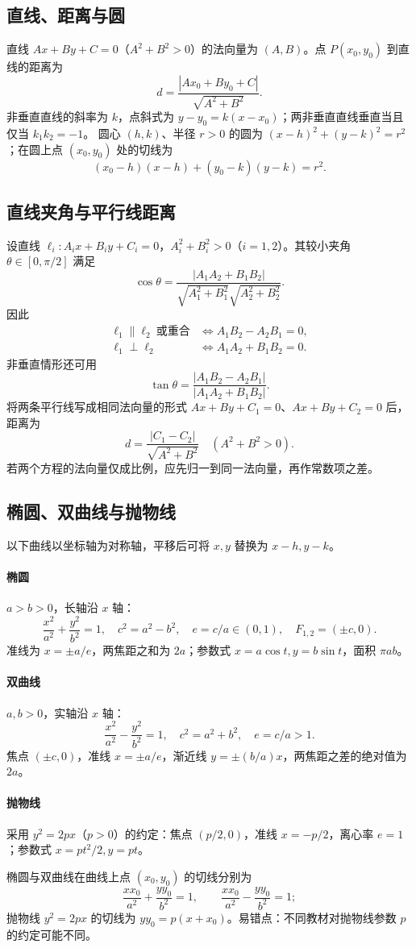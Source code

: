 \documentclass[../main.tex]{subfiles}
\begin{document}
\subsection{直线、距离与圆}
直线 $Ax+By+C=0$（$A^2+B^2>0$）的法向量为 $(A,B)$。点 $P(x_0,y_0)$ 到直线的距离为
\[
d=\frac{|Ax_0+By_0+C|}{\sqrt{A^2+B^2}}.
\]
非垂直直线的斜率为 $k$，点斜式为 $y-y_0=k(x-x_0)$；两非垂直直线垂直当且仅当 $k_1k_2=-1$。
圆心 $(h,k)$、半径 $r>0$ 的圆为 $(x-h)^2+(y-k)^2=r^2$；在圆上点 $(x_0,y_0)$ 处的切线为
\[
(x_0-h)(x-h)+(y_0-k)(y-k)=r^2.
\]
\subsection{直线夹角与平行线距离}
设直线 $\ell_i:A_ix+B_iy+C_i=0$，$A_i^2+B_i^2>0$（$i=1,2$）。其较小夹角 $\theta\in[0,\pi/2]$ 满足
\[
\cos\theta=
\frac{|A_1A_2+B_1B_2|}
{\sqrt{A_1^2+B_1^2}\sqrt{A_2^2+B_2^2}}.
\]
因此
\begin{align*}
\ell_1\parallel\ell_2\ \text{或重合}
&\iff A_1B_2-A_2B_1=0,\\
\ell_1\perp\ell_2&\iff A_1A_2+B_1B_2=0.
\end{align*}
非垂直情形还可用
\[
\tan\theta=\frac{|A_1B_2-A_2B_1|}{|A_1A_2+B_1B_2|}.
\]
将两条平行线写成相同法向量的形式 $Ax+By+C_1=0$、$Ax+By+C_2=0$ 后，距离为
\[
d=\frac{|C_1-C_2|}{\sqrt{A^2+B^2}}\quad(A^2+B^2>0).
\]
若两个方程的法向量仅成比例，应先归一到同一法向量，再作常数项之差。
\subsection{椭圆、双曲线与抛物线}
以下曲线以坐标轴为对称轴，平移后可将 $x,y$ 替换为 $x-h,y-k$。
\paragraph{椭圆} $a>b>0$，长轴沿 $x$ 轴：
\[
\frac{x^2}{a^2}+\frac{y^2}{b^2}=1,\quad c^2=a^2-b^2,\quad
e=c/a\in(0,1),\quad F_{1,2}=(\pm c,0).
\]
准线为 $x=\pm a/e$，两焦距之和为 $2a$；参数式 $x=a\cos t,y=b\sin t$，面积 $\pi ab$。
\paragraph{双曲线} $a,b>0$，实轴沿 $x$ 轴：
\[
\frac{x^2}{a^2}-\frac{y^2}{b^2}=1,\quad c^2=a^2+b^2,\quad e=c/a>1.
\]
焦点 $(\pm c,0)$，准线 $x=\pm a/e$，渐近线 $y=\pm(b/a)x$，两焦距之差的绝对值为 $2a$。
\paragraph{抛物线} 采用 $y^2=2px$（$p>0$）的约定：焦点 $(p/2,0)$，准线 $x=-p/2$，离心率 $e=1$；参数式 $x=pt^2/2,y=pt$。
\par\begin{samepage}
椭圆与双曲线在曲线上点 $(x_0,y_0)$ 的切线分别为
\[
\frac{xx_0}{a^2}+\frac{yy_0}{b^2}=1,\qquad
\frac{xx_0}{a^2}-\frac{yy_0}{b^2}=1;
\]
抛物线 $y^2=2px$ 的切线为 $yy_0=p(x+x_0)$。易错点：不同教材对抛物线参数 $p$ 的约定可能不同。
\par\end{samepage}
\end{document}
